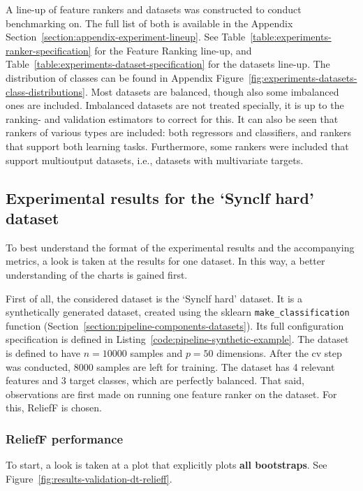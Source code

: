 \documentclass[../main.tex]{subfiles}
\begin{document}
A line-up of feature rankers and datasets was constructed to conduct benchmarking on. The full list of both is available in the Appendix Section~\ref{section:appendix-experiment-lineup}. See Table~\ref{table:experiments-ranker-specification} for the Feature Ranking line-up, and Table~\ref{table:experiments-dataset-specification} for the datasets line-up. The distribution of classes can be found in Appendix Figure~\ref{fig:experiments-datasets-class-distributions}. Most datasets are balanced, though also some imbalanced ones are included. Imbalanced datasets are not treated specially, it is up to the ranking- and validation estimators to correct for this. It can also be seen that rankers of various types are included: both regressors and classifiers, and rankers that support both learning tasks. Furthermore, some rankers were included that support multioutput datasets, i.e., datasets with multivariate targets.




\subsection{Experimental results for the `Synclf hard' dataset}\label{section:experiments-example}
To best understand the format of the experimental results and the accompanying metrics, a look is taken at the results for one dataset. In this way, a better understanding of the charts is gained first.

First of all, the considered dataset is the `Synclf hard' dataset. It is a synthetically generated dataset, created using the sklearn \texttt{make\_classification} function (Section~\ref{section:pipeline-components-datasets}). Its full configuration specification is defined in Listing~\ref{code:pipeline-synthetic-example}. The dataset is defined to have $n=10000$ samples and $p=50$ dimensions. After the \gls{cv} step was conducted, 8000 samples are left for training. The dataset has 4 relevant features and 3 target classes, which are perfectly balanced. That said, observations are first made on running one feature ranker on the dataset. For this, ReliefF \citep{kononenko_estimating_1994} is chosen.
    



\subsubsection{ReliefF performance}

To start, a look is taken at a plot that explicitly plots \textbf{all bootstraps}. See Figure~\ref{fig:results-validation-dt-relieff}.
\end{document}
